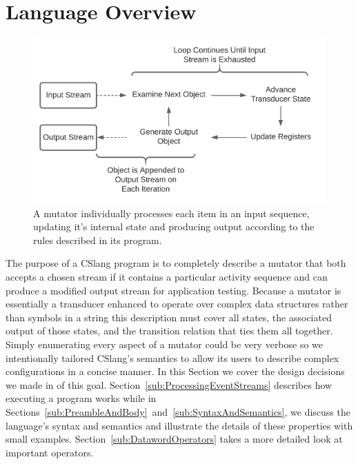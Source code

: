 \section{Language Overview}
\label{sec:Overview}

\begin{figure}[h]
  \centering
  \includegraphics[scale=.9]{images/processing}
  \caption{A mutator individually processes each item in an input
  sequence, updating it's internal state and producing output according
  to the rules described in its program.}
  \label{fig:Processing}
\end{figure}


The purpose
of a CSlang program is to completely describe a mutator
that both
accepts a chosen stream if it contains a particular
activity sequence and can produce a modified
output stream
for application testing.
Because a mutator is essentially a
transducer enhanced to operate over complex data structures
rather than symbols in a string
this description must cover all states,
the associated output of those states,
and the transition
relation that ties them all together.
Simply enumerating every aspect of a mutator could be very verbose
so we intentionally tailored CSlang's semantics to allow its users to
describe complex configurations in a concise manner.
In this Section we cover the design decisions we made
in of this goal.
Section~\ref{sub:ProcessingEventStreams} describes how executing a program works
while
in Sections~\ref{sub:PreambleAndBody}~and~\ref{sub:SyntaxAndSemantics},
we discuss the
language's syntax and semantics and illustrate the details
of these properties
with small examples.
Section~\ref{sub:DatawordOperators} takes a more
detailed look at important operators.

